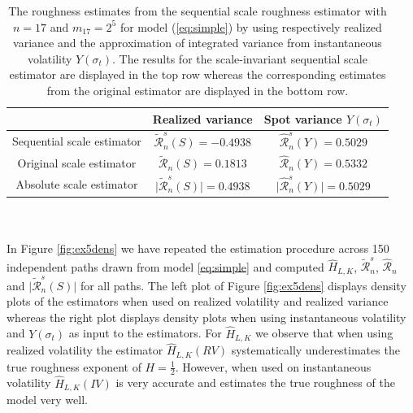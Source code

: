 \documentclass{article}
\begin{document}
\begin{table}[htbp]
    \centering
    \begin{tabular}{ccc}
        \toprule
         & Realized variance & Spot variance $Y(\sigma_t)$ \\
        \midrule
        Sequential scale estimator & $\widetilde{\mathscr{R}}_n^s (S) = -0.4938 $ & $\widehat{\mathscr{R}}_n^s (Y) = 0.5029$ \\
        Original scale estimator &$\widetilde{\mathscr{R}}_n (S) = 0.1813 $ & $\widehat{\mathscr{R}}_n (Y) = 0.5332$ \\
        Absolute scale estimator &$\lvert \widetilde{\mathscr{R}}_n^s (S)\rvert = 0.4938 $ & $\lvert \widehat{\mathscr{R}}_n^s (Y)\rvert = 0.5029$ \\
        \bottomrule
    \end{tabular}
    \caption{The roughness estimates from the sequential scale roughness estimator with $n=17$ and $m_{17}=2^5$ for model (\ref{eq:simple}) by using respectively realized variance and the approximation of integrated variance from instantaneous volatility $Y(\sigma_t)$. The results for the scale-invariant sequential scale estimator are displayed in the top row whereas the corresponding estimates from the original estimator are displayed in the bottom row.}
    \label{tab:ex5scaleest}
\end{table}\\\\
In Figure \ref{fig:ex5dens} we have repeated the estimation procedure across 150 independent paths drawn from model \eqref{eq:simple} and computed $\widehat{H}_{L,K}$, $\widetilde{\mathscr{R}}_n^s$, $\widehat{\mathscr{R}}_n$ and $\lvert \widetilde{\mathscr{R}}_n^s (S)\rvert$ for all paths. The left plot of Figure \ref{fig:ex5dens} displays density plots of the estimators when used on realized volatility and realized variance whereas the right plot displays density plots when using instantaneous volatility and $Y(\sigma_t)$ as input to the estimators. For $\widehat{H}_{L,K}$ we observe that when using realized volatility the estimator $\widehat{H}_{L,K}(RV)$ systematically underestimates the true roughness exponent of $H=\frac{1}{2}$. However, when used on instantaneous volatility $\widehat{H}_{L,K}(IV)$ is very accurate and estimates the true roughness of the model very well. 
\end{document}
